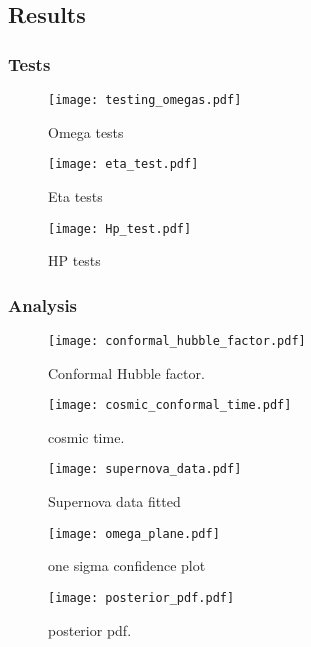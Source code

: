 \subsection{Results}\label{sec:m1:results}

\subsubsection{Tests}\label{sec:m1:results:tests}

\begin{figure}
    \texttt{[image: testing\_omegas.pdf]}
    \caption{Omega tests}
    \label{fig:m1:omega_tests}
\end{figure}

\begin{figure}
    \texttt{[image: eta\_test.pdf]}
    \caption{Eta tests}
    \label{fig:m1:eta_tests}
\end{figure}

\begin{figure}
    \texttt{[image: Hp\_test.pdf]}
    \caption{HP tests}
    \label{fig:m1:Hp_tests}
\end{figure}

\subsubsection{Analysis}

\begin{figure}
    \texttt{[image: conformal\_hubble\_factor.pdf]}
    \caption{Conformal Hubble factor.}
    \label{fig:m1:conformal_hubble_factor_Hp}
\end{figure}

\begin{figure}
    \texttt{[image: cosmic\_conformal\_time.pdf]}
    \caption{cosmic time.}
    \label{fig:m1:cosmic_conformal_time}
\end{figure}

\begin{figure}
    \texttt{[image: supernova\_data.pdf]}
    \caption{Supernova data fitted}
    \label{fig:m1:supernova_data}
\end{figure}

\begin{figure}
    \texttt{[image: omega\_plane.pdf]}
    \caption{one sigma confidence plot}
    \label{fig:m1:omega_planes}
\end{figure}

\begin{figure}
    \texttt{[image: posterior\_pdf.pdf]}
    \caption{posterior pdf.}
    \label{fig:m1:posterior_pdf}
\end{figure}

